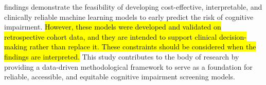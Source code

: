 findings demonstrate the feasibility of developing cost-effective, interpretable, and clinically reliable machine learning models to early predict the risk of cognitive impairment. \hl{However, these models were developed and validated on retrospective cohort data, and they are intended to support clinical decision-making rather than replace it. These constraints should be considered when the findings are interpreted.} This study contributes to the body of research by providing a data-driven methodological framework to serve as a foundation for reliable, accessible, and equitable cognitive impairment screening models.